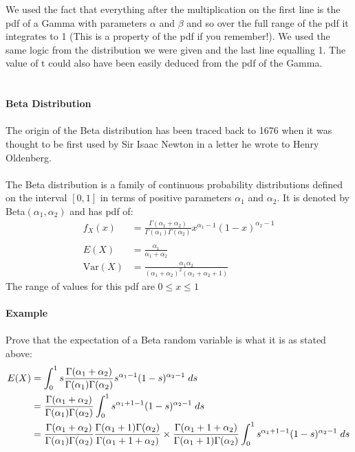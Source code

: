 \documentclass[,oneside]{article}
\begin{document}
\begin{enumerate}
We used the fact that everything after the multiplication on the first line is the pdf of a Gamma with parameters $\alpha$ and $\beta$ and so over the full range of the pdf it integrates to 1 (This is a property of the pdf if you remember!). We used the same logic from the distribution we were given and the last line equalling 1. The value of t could also have been easily deduced from the pdf of the Gamma.\\ \\ \\
\textbf{Beta Distribution}\\ \\
The origin of the Beta distribution has been traced back to 1676 when it was thought to be first used by Sir Isaac Newton in a letter he wrote to Henry Oldenberg. \\ \\
The Beta distribution is a family of continuous probability distributions defined on the interval $[0,1]$ in terms of positive parameters $\alpha_1$ and $\alpha_2$. It is denoted by Beta$(\alpha_1 , \alpha_2)$ and has pdf of:\\
\begin{align*}
f_X(x)&= \frac{\Gamma(\alpha_1 + \alpha_2)}{\Gamma(\alpha_1)\Gamma(\alpha_2)}x^{\alpha_1 -1}(1-x)^{\alpha_2 -1}\\ \\
E(X) &= \frac{\alpha_1}{\alpha_1 + \alpha_2}\\
\text{Var}(X)&=\frac{\alpha_1 \alpha_2}{(\alpha_1 + \alpha_2)^2 (\alpha_1 + \alpha_2 + 1)}
\end{align*}
The range of values for this pdf are $0 \leq x \leq 1$\\ \\
\textbf{Example}\\ \\
Prove that the expectation of a Beta random variable is what it is as stated above:\\
\begin{align*}
E(X) &= \int_{0}^{1} s\frac{\Gamma(\alpha_1 + \alpha_2)}{\Gamma(\alpha_1)\Gamma(\alpha_2)}s^{\alpha_1 -1}(1-s)^{\alpha_2 -1} \hspace{0.1cm}ds\\
&=\frac{\Gamma(\alpha_1 + \alpha_2)}{\Gamma(\alpha_1)\Gamma(\alpha_2)} \int_{0}^{1} s^{\alpha_1 +1-1} (1-s)^{\alpha_2 -1} \hspace{0.1cm}ds\\
&= \frac{\Gamma(\alpha_1 + \alpha_2)}{\Gamma(\alpha_1)\Gamma(\alpha_2)} \frac{\Gamma(\alpha_1 +1)\Gamma(\alpha_2)}{\Gamma(\alpha_1 +1 + \alpha_2)} \times \frac{\Gamma(\alpha_1 + 1 + \alpha_2)}{\Gamma(\alpha_1 +1)\Gamma(\alpha_2)}  \int_{0}^{1} s^{\alpha_1 +1-1} (1-s)^{\alpha_2 -1} \hspace{0.1cm}ds\\

\end{align*}
\end{enumerate}
\end{document}
